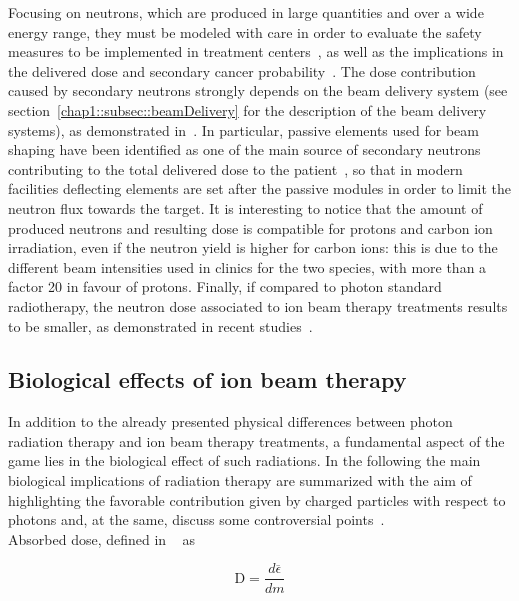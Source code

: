 Focusing on neutrons, which are produced in large quantities and over a wide energy range, they must be modeled with care in order to evaluate the safety measures to be implemented in treatment centers~\parencite{Newhauser2002}, as well as the implications in the delivered dose and secondary cancer probability~\parencite{Newhauser2011}. The dose contribution caused by secondary neutrons strongly depends on the beam delivery system (see section~\ref{chap1::subsec::beamDelivery} for the description of the beam delivery systems), as demonstrated in~\cite{Gottschalk2006}. In particular, passive elements used for beam shaping have been identified as one of the main source of secondary neutrons contributing to the total delivered dose to the patient~\parencite{Yan2002}, so that in modern facilities deflecting elements are set after the passive modules in order to limit the neutron flux towards the target. It is interesting to notice that the amount of produced neutrons and resulting dose is compatible for protons and carbon ion irradiation, even if the neutron yield is higher for carbon ions: this is due to the different beam intensities used in clinics for the two species, with more than a factor 20 in favour of protons. Finally, if compared to photon standard radiotherapy, the neutron dose associated to ion beam therapy treatments results to be smaller, as demonstrated in recent studies~\parencite{Schneider2015}.\\

\subsection{Biological effects of ion beam therapy}\label{chap1::subsec::bioEffects} 

In addition to the already presented physical differences between photon radiation therapy and ion beam therapy treatments, a fundamental aspect of the game  lies in the biological effect of such radiations. In the following the main biological implications of radiation therapy are summarized with the aim of highlighting the favorable contribution given by charged particles with respect to photons and, at the same, discuss some controversial points~\parencite{Paganetti2013}.\\
   

Absorbed dose, defined in ~\cite{ICRU1980, ICRU1998} as 

\begin{equation}
\mathrm{D} = \frac{d\overline{\epsilon}}{dm}
\label{chap1::eq::AbsDoseDef}
\end{equation}

